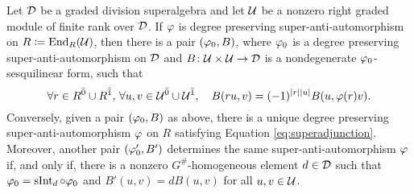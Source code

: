 \documentclass{amsbook}
\begin{document}






\begin{thm}\label{thm:vphi-iff-vphi0-and-B}
    Let $\mathcal{D}$ be a graded division superalgebra and let $\mathcal U$ be a nonzero right graded module of finite rank over $\mathcal{D}$. 
    If $\varphi$ is degree preserving super-anti-automorphism on $R \coloneqq \operatorname{End}_R(\mathcal U)$, then there is a pair $(\varphi_0, B)$, where $\varphi_0$ is a degree preserving super-anti-automorphism on $\mathcal{D}$ and $B\colon \mathcal U \times \mathcal U \to \mathcal{D}$ is a nondegenerate $\varphi_0$-sesquilinear form, such that
    \begin{equation}\label{eq:superadjunction}
        \forall r\in R^{\bar0} \cup R^{\bar1},\,\forall u, v \in \mathcal U^{\bar0} \cup \mathcal U^{\bar1},  \quad B(ru,v) = (-1)^{|r||u|} B(u,\varphi(r)v).
    \end{equation}
    Conversely, given a pair $(\varphi_0, B)$ as above, there is a unique degree preserving super-anti-automorphism $\varphi$ on $R$ satisfying Equation \eqref{eq:superadjunction}. 
    Moreover, another pair $(\varphi_0', B')$ determines the same super-anti-automorphism $\varphi$ if, and only if, there is a nonzero $G^\#$-homogeneous element $d\in \mathcal{D}$ such that $\varphi_0 = \operatorname{sInt}_d \circ \varphi_0$ and $B'(u, v) = dB (u, v)$ for all $u, v \in \mathcal U$.
\end{thm}
\end{document}
